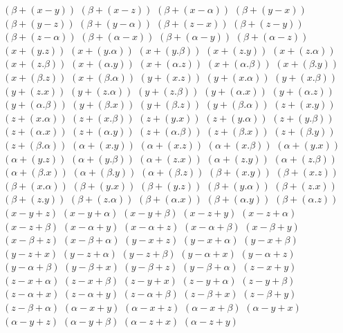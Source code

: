 $ (\beta + (x - y)) $
$ (\beta + (x - z)) $
$ (\beta + (x - \alpha)) $
$ (\beta + (y - x)) $
$ (\beta + (y - z)) $
$ (\beta + (y - \alpha)) $
$ (\beta + (z - x)) $
$ (\beta + (z - y)) $
$ (\beta + (z - \alpha)) $
$ (\beta + (\alpha - x)) $
$ (\beta + (\alpha - y)) $
$ (\beta + (\alpha - z)) $
$ (x + (y . z)) $
$ (x + (y . \alpha)) $
$ (x + (y . \beta)) $
$ (x + (z . y)) $
$ (x + (z . \alpha)) $
$ (x + (z . \beta)) $
$ (x + (\alpha . y)) $
$ (x + (\alpha . z)) $
$ (x + (\alpha . \beta)) $
$ (x + (\beta . y)) $
$ (x + (\beta . z)) $
$ (x + (\beta . \alpha)) $
$ (y + (x . z)) $
$ (y + (x . \alpha)) $
$ (y + (x . \beta)) $
$ (y + (z . x)) $
$ (y + (z . \alpha)) $
$ (y + (z . \beta)) $
$ (y + (\alpha . x)) $
$ (y + (\alpha . z)) $
$ (y + (\alpha . \beta)) $
$ (y + (\beta . x)) $
$ (y + (\beta . z)) $
$ (y + (\beta . \alpha)) $
$ (z + (x . y)) $
$ (z + (x . \alpha)) $
$ (z + (x . \beta)) $
$ (z + (y . x)) $
$ (z + (y . \alpha)) $
$ (z + (y . \beta)) $
$ (z + (\alpha . x)) $
$ (z + (\alpha . y)) $
$ (z + (\alpha . \beta)) $
$ (z + (\beta . x)) $
$ (z + (\beta . y)) $
$ (z + (\beta . \alpha)) $
$ (\alpha + (x . y)) $
$ (\alpha + (x . z)) $
$ (\alpha + (x . \beta)) $
$ (\alpha + (y . x)) $
$ (\alpha + (y . z)) $
$ (\alpha + (y . \beta)) $
$ (\alpha + (z . x)) $
$ (\alpha + (z . y)) $
$ (\alpha + (z . \beta)) $
$ (\alpha + (\beta . x)) $
$ (\alpha + (\beta . y)) $
$ (\alpha + (\beta . z)) $
$ (\beta + (x . y)) $
$ (\beta + (x . z)) $
$ (\beta + (x . \alpha)) $
$ (\beta + (y . x)) $
$ (\beta + (y . z)) $
$ (\beta + (y . \alpha)) $
$ (\beta + (z . x)) $
$ (\beta + (z . y)) $
$ (\beta + (z . \alpha)) $
$ (\beta + (\alpha . x)) $
$ (\beta + (\alpha . y)) $
$ (\beta + (\alpha . z)) $
$ (x - y + z) $
$ (x - y + \alpha) $
$ (x - y + \beta) $
$ (x - z + y) $
$ (x - z + \alpha) $
$ (x - z + \beta) $
$ (x - \alpha + y) $
$ (x - \alpha + z) $
$ (x - \alpha + \beta) $
$ (x - \beta + y) $
$ (x - \beta + z) $
$ (x - \beta + \alpha) $
$ (y - x + z) $
$ (y - x + \alpha) $
$ (y - x + \beta) $
$ (y - z + x) $
$ (y - z + \alpha) $
$ (y - z + \beta) $
$ (y - \alpha + x) $
$ (y - \alpha + z) $
$ (y - \alpha + \beta) $
$ (y - \beta + x) $
$ (y - \beta + z) $
$ (y - \beta + \alpha) $
$ (z - x + y) $
$ (z - x + \alpha) $
$ (z - x + \beta) $
$ (z - y + x) $
$ (z - y + \alpha) $
$ (z - y + \beta) $
$ (z - \alpha + x) $
$ (z - \alpha + y) $
$ (z - \alpha + \beta) $
$ (z - \beta + x) $
$ (z - \beta + y) $
$ (z - \beta + \alpha) $
$ (\alpha - x + y) $
$ (\alpha - x + z) $
$ (\alpha - x + \beta) $
$ (\alpha - y + x) $
$ (\alpha - y + z) $
$ (\alpha - y + \beta) $
$ (\alpha - z + x) $
$ (\alpha - z + y) $
